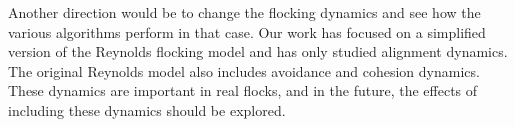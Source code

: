 Another direction would be to change the flocking dynamics and see how the
various algorithms perform in that case.
Our work has focused on a simplified version of the Reynolds flocking model and
has only studied alignment dynamics.
The original Reynolds model also includes avoidance and cohesion dynamics.
These dynamics are important in real flocks, and in the future, the effects of
including these dynamics should be explored.

%



